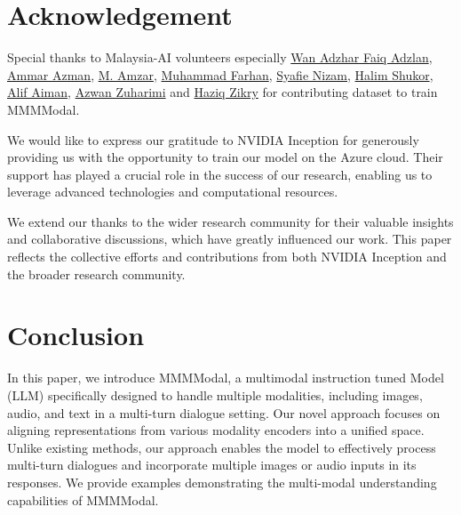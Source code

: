 \documentclass[preprint]{article}
\begin{document}
\section{Acknowledgement}

Special thanks to Malaysia-AI volunteers especially \href{https://www.linkedin.com/in/wan-adzhar-faiq-adzlan-19a27baa/}{Wan Adzhar Faiq Adzlan}, \href{https://www.linkedin.com/in/ammar-azman/}{Ammar Azman}, \href{https://www.linkedin.com/in/amzar96/}{M. Amzar}, \href{https://www.linkedin.com/in/muhammad-farhan-helmy-0529501a7/}{Muhammad Farhan}, \href{https://www.linkedin.com/in/syafie-nizam/}{Syafie Nizam}, \href{https://www.linkedin.com/in/halimshukor/}{Halim Shukor}, \href{https://www.linkedin.com/in/alif-aiman-1b334b24b/}{Alif Aiman}, \href{https://www.linkedin.com/in/azwan-zuharimi/}{Azwan Zuharimi} and \href{https://www.linkedin.com/in/haziqzikry/}{Haziq Zikry} for contributing dataset to train MMMModal.

We would like to express our gratitude to NVIDIA Inception for generously providing us with the opportunity to train our model on the Azure cloud. Their support has played a crucial role in the success of our research, enabling us to leverage advanced technologies and computational resources.

We extend our thanks to the wider research community for their valuable insights and collaborative discussions, which have greatly influenced our work. This paper reflects the collective efforts and contributions from both NVIDIA Inception and the broader research community.

\section{Conclusion}

In this paper, we introduce MMMModal, a multimodal instruction tuned Model (LLM) specifically designed to handle multiple modalities, including images, audio, and text in a multi-turn dialogue setting. Our novel approach focuses on aligning representations from various modality encoders into a unified space. Unlike existing methods, our approach enables the model to effectively process multi-turn dialogues and incorporate multiple images or audio inputs in its responses. We provide examples demonstrating the multi-modal understanding capabilities of MMMModal.

{}

\end{document}

